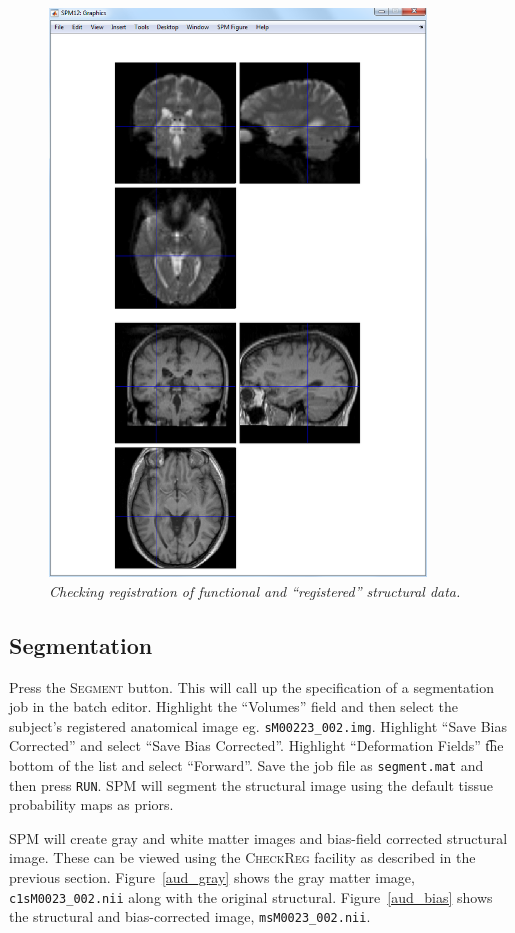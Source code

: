 \begin{figure}
\begin{center}
\includegraphics[width=100mm]{auditory/checkreg}
\caption{\em Checking registration of functional and ``registered'' structural data. \label{aud_checkreg}}
\end{center}
\end{figure}

\subsection{Segmentation}

Press the \textsc{Segment} button. This will call up the specification of a segmentation job in the batch editor. Highlight the ``Volumes'' field and then select the subject's registered anatomical image eg. \texttt{sM00223\_002.img}. Highlight ``Save Bias Corrected'' and select ``Save Bias Corrected''. Highlight ``Deformation Fields'' \t the bottom of the list and select ``Forward''. Save the job file as \texttt{segment.mat} and then press \texttt{RUN}. SPM will segment the structural image using the default tissue probability maps as priors. 

SPM will create gray and white matter images and bias-field corrected structural image. These can be viewed using the \textsc{CheckReg} facility as described in the previous section. Figure~\ref{aud_gray} shows the gray matter image, \texttt{c1sM0023\_002.nii} along with the original structural. Figure~\ref{aud_bias} shows the structural and bias-corrected image, \texttt{msM0023\_002.nii}.

